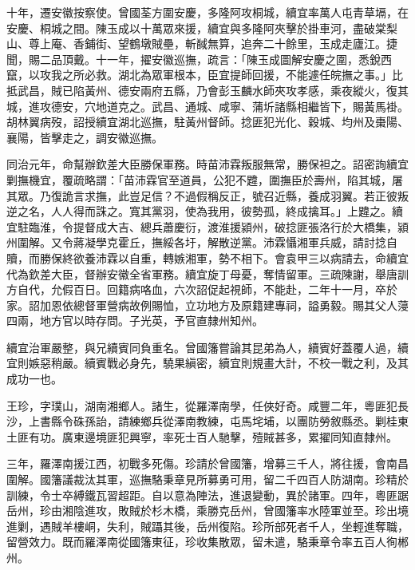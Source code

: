 \begin{pinyinscope}
十年，遷安徽按察使。曾國荃方圍安慶，多隆阿攻桐城，續宜率萬人屯青草塥，在安慶、桐城之間。陳玉成以十萬眾來援，續宜與多隆阿夾擊於掛車河，盡破棠梨山、尊上庵、香鋪街、望鶴墩賊壘，斬馘無算，追奔二十餘里，玉成走廬江。捷聞，賜二品頂戴。十一年，擢安徽巡撫，疏言：「陳玉成圖解安慶之圍，悉銳西竄，以攻我之所必救。湖北為眾軍根本，臣宜提師回援，不能遽任皖撫之事。」比抵武昌，賊已陷黃州、德安兩府五縣，乃會彭玉麟水師夾攻孝感，乘夜縱火，復其城，進攻德安，穴地道克之。武昌、通城、咸寧、蒲圻諸縣相繼皆下，賜黃馬褂。胡林翼病歿，詔授續宜湖北巡撫，駐黃州督師。捻匪犯光化、穀城、均州及棗陽、襄陽，皆擊走之，調安徽巡撫。

同治元年，命幫辦欽差大臣勝保軍務。時苗沛霖叛服無常，勝保袒之。詔密詢續宜剿撫機宜，覆疏略謂：「苗沛霖官至道員，公犯不韙，圍撫臣於壽州，陷其城，屠其眾。乃復詭言求撫，此豈足信？不過假稱反正，號召近縣，養成羽翼。若正彼叛逆之名，人人得而誅之。寬其黨羽，使為我用，彼勢孤，終成擒耳。」上韙之。續宜駐臨淮，令提督成大吉、總兵蕭慶衍，渡淮援潁州，破捻匪張洛行於大橋集，潁州圍解。又令蔣凝學克霍丘，撫綏各圩，解散逆黨。沛霖懾湘軍兵威，請討捻自贖，而勝保終欲養沛霖以自重，轉嫉湘軍，勢不相下。會袁甲三以病請去，命續宜代為欽差大臣，督辦安徽全省軍務。續宜旋丁母憂，奪情留軍。三疏陳謝，舉唐訓方自代，允假百日。回籍病咯血，六次詔促起視師，不能赴，二年十一月，卒於家。詔加恩依總督軍營病故例賜恤，立功地方及原籍建專祠，謚勇毅。賜其父人蓡四兩，地方官以時存問。子光英，予官直隸州知州。

續宜治軍嚴整，與兄續賓同負重名。曾國籓嘗論其昆弟為人，續賓好蓋覆人過，續宜則嫉惡稍嚴。續賓戰必身先，驍果縝密，續宜則規畫大計，不校一戰之利，及其成功一也。

王珍，字璞山，湖南湘鄉人。諸生，從羅澤南學，任俠好奇。咸豐二年，粵匪犯長沙，上書縣令硃孫詒，請練鄉兵從澤南教練，屯馬垞埔，以團防勞敘縣丞。剿桂東土匪有功。廣東邊境匪犯興寧，率死士百人馳擊，殪賊甚多，累擢同知直隸州。

三年，羅澤南援江西，初戰多死傷。珍請於曾國籓，增募三千人，將往援，會南昌圍解。國籓議裁汰其軍，巡撫駱秉章見所募勇可用，留二千四百人防湖南。珍精於訓練，令士卒縛鐵瓦習超距。自以意為陣法，進退變動，異於諸軍。四年，粵匪踞岳州，珍由湘陰進攻，敗賊於杉木橋，乘勝克岳州，曾國籓率水陸軍並至。珍出境進剿，遇賊羊樓峒，失利，賊躡其後，岳州復陷。珍所部死者千人，坐輕進奪職，留營效力。既而羅澤南從國籓東征，珍收集散眾，留未遣，駱秉章令率五百人徇郴州。


\end{pinyinscope}
